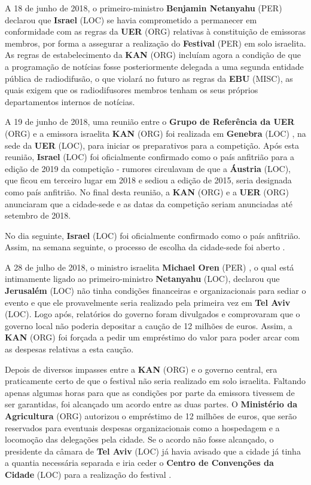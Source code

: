\documentclass[12pt,a4paper]{article}
\begin{document}
A 18 de junho de 2018, o primeiro-ministro \textbf{Benjamin Netanyahu} (PER) declarou que \textbf{Israel} (LOC) se havia comprometido a permanecer em conformidade com as regras da \textbf{UER} (ORG) relativas à constituição de emissoras membros, por forma a assegurar a realização do \textbf{Festival} (PER) em solo israelita. As regras de estabelecimento da \textbf{KAN} (ORG) incluíam agora a condição de que a programação de notícias fosse posteriormente delegada a uma segunda entidade pública de radiodifusão, o que violará no futuro as regras da \textbf{EBU} (MISC), as quais exigem que os radiodifusores membros tenham os seus próprios departamentos internos de notícias.

A 19 de junho de 2018, uma reunião entre o \textbf{Grupo de Referência da UER} (ORG) e a emissora israelita \textbf{KAN} (ORG) foi realizada em \textbf{Genebra} (LOC) , na sede da \textbf{UER} (LOC), para iniciar os preparativos para a competição. Após esta reunião, \textbf{Israel} (LOC) foi oficialmente confirmado como o país anfitrião para a edição de 2019 da competição - rumores circulavam de que a \textbf{Áustria} (LOC), que ficou em terceiro lugar em 2018 e sediou a edição de 2015, seria designada como país anfitrião. No final desta reunião, a \textbf{KAN} (ORG) e a \textbf{UER} (ORG) anunciaram que a cidade-sede e as datas da competição seriam anunciadas até setembro de 2018.

No dia seguinte, \textbf{Israel} (LOC) foi oficialmente confirmado como o país anfitrião. Assim, na semana seguinte, o processo de escolha da cidade-sede foi aberto .

A 28 de julho de 2018, o ministro israelita \textbf{Michael Oren} (PER) , o qual está intimamente ligado ao primeiro-ministro \textbf{Netanyahu} (LOC), declarou que \textbf{Jerusalém} (LOC) não tinha condições financeiras e organizacionais para sediar o evento e que ele provavelmente seria realizado pela primeira vez em \textbf{Tel Aviv} (LOC). Logo após, relatórios do governo foram divulgados e comprovaram que o governo local não poderia depositar a caução de 12 milhões de euros. Assim, a \textbf{KAN} (ORG) foi forçada a pedir um empréstimo do valor para poder arcar com as despesas relativas a esta caução.

Depois de diversos impasses entre a \textbf{KAN} (ORG) e o governo central, era praticamente certo de que o festival não seria realizado em solo israelita. Faltando apenas algumas horas para que as condições por parte da emissora tivessem de ser garantidas, foi alcançado um acordo entre as duas partes. O \textbf{Ministério da Agricultura} (ORG) autorizou o empréstimo de 12 milhões de euros, que serão reservados para eventuais despesas organizacionais como a hospedagem e a locomoção das delegações pela cidade. Se o acordo não fosse alcançado, o presidente da câmara de \textbf{Tel Aviv} (LOC) já havia avisado que a cidade já tinha a quantia necessária separada e iria ceder o \textbf{Centro de Convenções da Cidade} (LOC) para a realização do festival .
\end{document}
